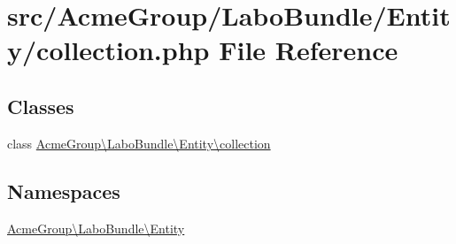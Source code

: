 \hypertarget{collection_8php}{\section{src/\+Acme\+Group/\+Labo\+Bundle/\+Entity/collection.php File Reference}
\label{collection_8php}
}
\subsection*{Classes}
\begin{DoxyCompactItemize}
\item 
class \hyperlink{class_acme_group_1_1_labo_bundle_1_1_entity_1_1collection}{Acme\+Group\textbackslash{}\+Labo\+Bundle\textbackslash{}\+Entity\textbackslash{}collection}
\end{DoxyCompactItemize}
\subsection*{Namespaces}
\begin{DoxyCompactItemize}
\item 
 \hyperlink{namespace_acme_group_1_1_labo_bundle_1_1_entity}{Acme\+Group\textbackslash{}\+Labo\+Bundle\textbackslash{}\+Entity}
\end{DoxyCompactItemize}
